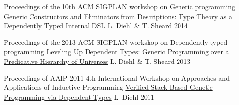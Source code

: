 \begin{cventries}
  \cventry
    {Proceedings of the 10th ACM SIGPLAN workshop on Generic programming} %
    {\href{https://github.com/larrytheliquid/generic-elim}{Generic Constructors and Eliminators from Descriptions: {\tiny Type Theory as a Dependently Typed Internal DSL}}} %
    {L. Diehl \& T. Sheard} %
    {2014} %
    {}


  \cventry
    {Proceedings of the 2013 ACM SIGPLAN workshop on Dependently-typed programming} %
    {\href{https://github.com/larrytheliquid/leveling-up}{Leveling Up Dependent Types: {\tiny Generic Programming over a Predicative Hierarchy of Universes}}} %
    {L. Diehl \& T. Sheard} %
    {2013} %
    {}

  \cventry
    {Proceedings of AAIP 2011 4th International Workshop on Approaches and Applications of Inductive Programming} %
    {\href{https://github.com/larrytheliquid/aaip11}{Verified Stack-Based Genetic Programming via Dependent Types}} %
    {L. Diehl} %
    {2011} %
    {}

\end{cventries}
